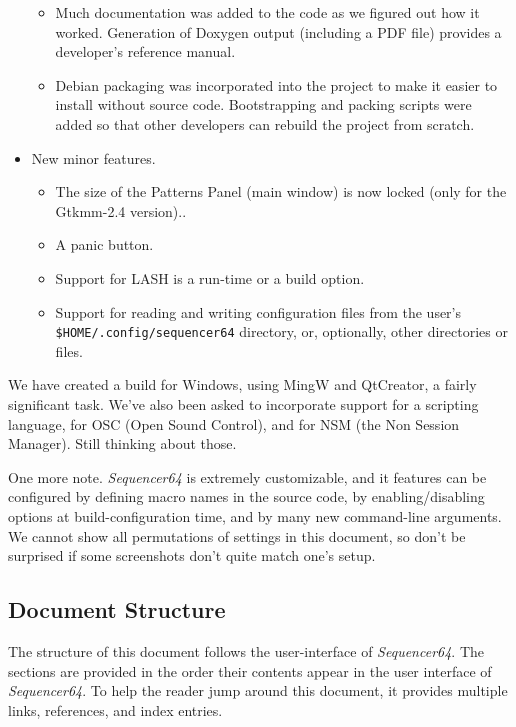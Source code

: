 \documentclass[
 11pt,
 twoside,
 a4paper,
 headinclude,
 footinclude,
 final                                 %
]{article}
\begin{document}
\begin{itemize}
\begin{itemize}
         \item Much documentation was added to the code as we figured
            out how it worked.  Generation of Doxygen output (including a PDF
            file) provides a developer's reference manual.
         \item Debian packaging was incorporated into the project to make it
            easier to install without source code.  Bootstrapping and
            packing scripts were added so that other developers can rebuild the
            project from scratch.
      \end{itemize}
      \item New minor features.
      \begin{itemize}
         \item The size of the Patterns Panel (main window) is now locked (only
         for the Gtkmm-2.4 version)..
         \item A panic button.
         \item Support for LASH is a run-time or a build option.
         \item Support for reading and writing configuration files from the
            user's \texttt{\$HOME/.config/sequencer64} directory, or,
            optionally, other directories or files.
      \end{itemize}
   \end{itemize}

   We have created a build
   for Windows, using MingW and QtCreator, a fairly significant task.
   We've also been asked to incorporate support for 
   a scripting language, for OSC (Open Sound
   Control), and for NSM (the Non Session Manager).
   Still thinking about those.

   One more note.  \textsl{Sequencer64} is extremely customizable, and
   it features can be configured by defining macro names in the source code,
   by enabling/disabling options at build-configuration time, and by many new
   command-line arguments.  We cannot show all permutations of settings in this
   document, so don't be surprised if some screenshots don't quite match
   one's setup.

\subsection{Document Structure}
\label{subsec:introduction_document_structure}

   The structure of this document follows the user-interface of
   \textsl{Sequencer64}.  The sections are provided in the order
   their contents appear in the user interface of \textsl{Sequencer64}.  To
   help the reader jump around this document, it provides
   multiple links, references, and index entries.
\end{document}
